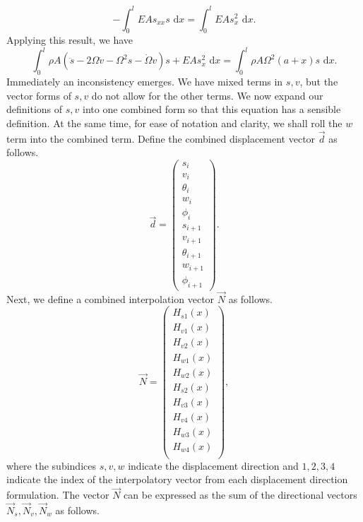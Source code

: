 \begin{equation}
-\int_0^l EAs_{xx}s\text{ d}x = \int_0^l EAs_x^2\text{ d}x.
\end{equation}
Applying this result, we have
\begin{equation}
\int_0^l \rho A(\ddot s-2\Omega\dot v-\Omega^2s-\dot\Omega v)s+EAs_x^2 \text{ d}x = \int_0^l \rho A\Omega^2(a+x)s\text{ d}x.
\label{eq:s_displacement_integral_nonsense}
\end{equation}
Immediately an inconsistency emerges. We have mixed terms in $s,v$, but the vector forms of $s,v$ do not allow for the other terms. We now expand our definitions of $s,v$ into one combined form so that this equation has a sensible definition. At the same time, for ease of notation and clarity, we shall roll the $w$ term into the combined term. Define the combined displacement vector $\vec d$ as follows.
\begin{equation}
\vec d = 
\begin{pmatrix}
s_i \\ 
v_i \\ 
\theta_i \\
w_i \\
\phi_i \\
s_{i+1} \\
v_{i+1} \\
\theta_{i+1} \\
w_{i+1} \\
\phi_{i+1}
\end{pmatrix}.
\end{equation}
Next, we define a combined interpolation vector $\vec{N}$ as follows.
\begin{equation}
\vec{N} = 
\begin{pmatrix}
H_{s1}(x) \\
H_{v1}(x) \\
H_{v2}(x) \\
H_{w1}(x) \\
H_{w2}(x) \\
H_{s2}(x) \\
H_{v3}(x) \\
H_{v4}(x) \\
H_{w3}(x) \\
H_{w4}(x) \\
\end{pmatrix},
\end{equation}
where the subindices $s,v,w$ indicate the displacement direction and $1,2,3,4$ indicate the index of the interpolatory vector from each displacement direction formulation. The vector $\vec N$ can be expressed as the sum of the directional vectors $\vec{N}_s,\vec{N}_v,\vec{N}_w$ as follows.
